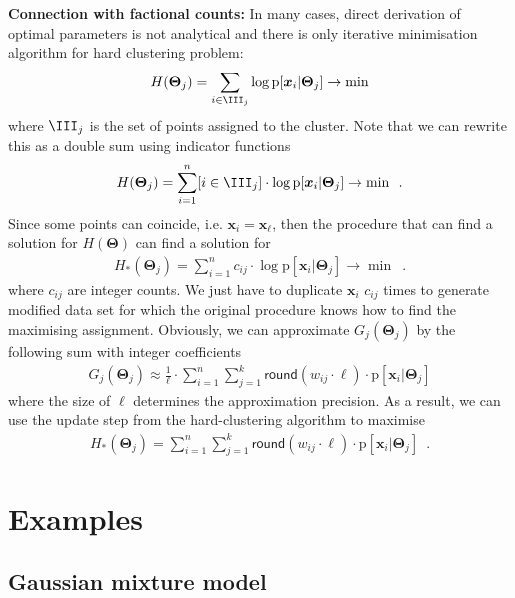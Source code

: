 \documentclass{article}
\renewcommand{\vec}[1]{\boldsymbol{#1}}
\newcommand{\pd}[1]{\mathrm{p}[#1]}
\begin{document}
\noindent\textbf{Connection with factional counts:}
In many cases, direct derivation of optimal parameters is not analytical and there is only iterative minimisation algorithm for hard clustering problem:
\begin{align*}
H(\vec{\Theta}_j)=\sum_{i\in\III_j}\log \pd{\vec{x}_i|\vec{\Theta}_j}\to\min
\end{align*}
where $\III_j$ is the set of points assigned to the cluster. Note that we can rewrite this as a double sum using indicator functions
\begin{align*}
H(\vec{\Theta}_j)=\sum_{i=1}^n[i\in\III_j]\cdot\log \pd{\vec{x}_i|\vec{\Theta}_j}\to\min\enspace.
\end{align*}
Since some points can coincide, i.e. $\vec{x}_{i}=\vec{x}_\ell$, then the procedure that can find a solution for $H(\vec{\Theta})$ can find a solution for 
\begin{align*}
H_*(\vec{\Theta}_j)= \sum_{i=1}^nc_{ij}\cdot\log \pd{\vec{x}_i|\vec{\Theta}_j}\to\min\enspace.
\end{align*}  
where $c_{ij}$ are integer counts. We just have to duplicate $\vec{x}_i$ $c_{ij}$ times to generate modified data set for which the original procedure knows how to find the maximising assignment. Obviously, we can approximate $G_j(\vec{\Theta}_j)$ by the following sum with integer coefficients
\begin{align*}
G_j(\vec{\Theta}_j)\approx\frac{1}{\ell}\cdot\sum_{i=1}^n\sum_{j=1}^k \mathsf{round}(w_{ij}\cdot \ell)\cdot \pd{\vec{x}_i|\vec{\Theta}_j}
\end{align*} 
where the size of $\ell$ determines the approximation precision. As a result, we can use the update step from the hard-clustering algorithm to maximise
\begin{align*}
 H_*(\vec{\Theta}_j)=\sum_{i=1}^n\sum_{j=1}^k \mathsf{round}(w_{ij}\cdot \ell)\cdot \pd{\vec{x}_i|\vec{\Theta}_j}\enspace.
\end{align*}
  
\section{Examples}  

\subsection{Gaussian mixture model}
\end{document}

